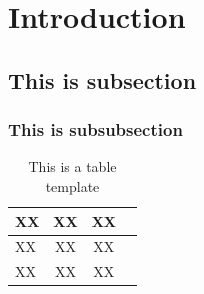 \documentclass{article}
\begin{document}
\begin{titlepage}
{\begin{tabular}{rl}
\end{tabular}}



\begin{center}

\vspace{0.5cm}





\end{center}
\end{titlepage}

\begin{abstract}

\end{abstract}
\vspace{4cm}

\renewcommand{\abstractname}{Acknowledgements}
\begin{abstract}
Thanking people 
\end{abstract}

\newpage


\newpage


\newpage

\newpage


\section{Introduction}
\subsection{This is subsection}
\subsubsection{This is subsubsection}

\begin{table}[H]
\caption{This is a table template}
\centering
\begin{tabular}{l c c c}
\hline\hline
XX & XX & XX  \\ [0.5ex] 
\hline
XX & XX & XX \\
XX & XX & XX \\
[1ex]
\hline
\end{tabular}
\label{table:template}
\end{table}
\end{document}

